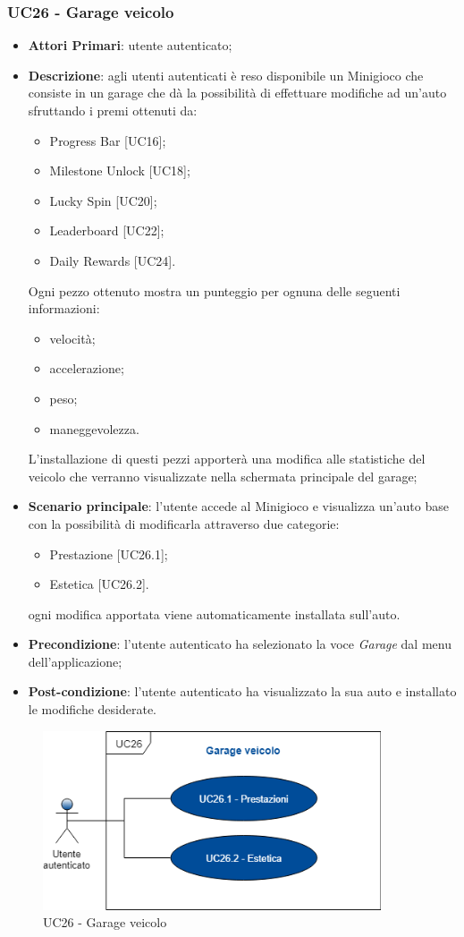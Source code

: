 \subsubsection{UC26 - Garage veicolo}
\begin{itemize}
	\item \textbf{Attori Primari}: utente autenticato;
	\item \textbf{Descrizione}: agli utenti autenticati è reso disponibile un Minigioco che consiste in un garage che dà la possibilità di effettuare modifiche ad un'auto sfruttando i premi ottenuti da:
	\begin{itemize}
		\item Progress Bar [UC16];
		\item Milestone Unlock [UC18];
		\item Lucky Spin [UC20];
		\item Leaderboard [UC22];
		\item Daily Rewards [UC24]. 
	\end{itemize} 
	Ogni pezzo ottenuto mostra un punteggio per ognuna delle seguenti informazioni:
	\begin{itemize}
		\item velocità;
		\item accelerazione;
		\item peso;
		\item maneggevolezza.
	\end{itemize}
	L'installazione di questi pezzi apporterà una modifica alle statistiche del veicolo che verranno visualizzate nella schermata principale del garage;
	\item \textbf{Scenario principale}: l'utente accede al Minigioco e visualizza un'auto base con la possibilità di modificarla attraverso due categorie:
	\begin{itemize}
		\item Prestazione [UC26.1];
		\item Estetica [UC26.2].
	\end{itemize}
	ogni modifica apportata viene automaticamente installata sull'auto.
	\item \textbf{Precondizione}: l'utente autenticato ha selezionato la voce \textit{Garage} dal menu dell'applicazione;
	\item \textbf{Post-condizione}: l'utente autenticato ha visualizzato la sua auto e installato le modifiche desiderate. 
\end{itemize}
\begin{figure}[h]
	\includegraphics[width=10cm]{res/images/UC26-Garage.png}
	\centering
	\caption{UC26 - Garage veicolo}
\end{figure}
\newpage
